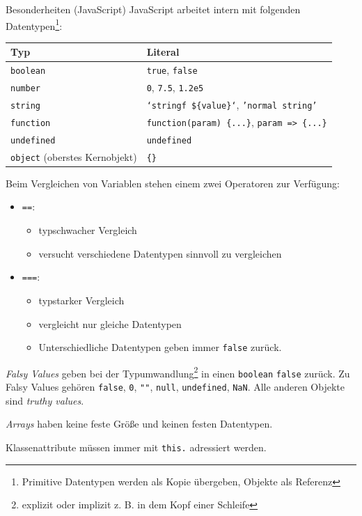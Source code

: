 \begin{bonus}{Besonderheiten (JavaScript)}
    JavaScript arbeitet intern mit folgenden Datentypen\footnote{Primitive Datentypen werden als Kopie übergeben, Objekte als Referenz}:

    \begin{tabular}{|l|l|}
        \hline
        Typ                                   & Literal                                                     \\\hline\hline
        \texttt{boolean}                      & \texttt{true}, \texttt{false}                               \\\hline
        \texttt{number}                       & \texttt{0}, \texttt{7.5}, \texttt{1.2e5}                    \\\hline
        \texttt{string}                       & \texttt{`stringf \$\{value\}`}, \texttt{'normal string'}    \\\hline %
        \texttt{function}                     & \texttt{function(param) \{...\}}, \texttt{param => \{...\}} \\\hline
        \texttt{undefined}                    & \texttt{undefined}                                          \\\hline
        \texttt{object} (oberstes Kernobjekt) & \texttt{\{\}}                                               \\\hline
    \end{tabular}

    Beim Vergleichen von Variablen stehen einem zwei Operatoren zur Verfügung:
    \begin{itemize}
        \item \texttt{==}:
              \begin{itemize}
                  \item typschwacher Vergleich
                  \item versucht verschiedene Datentypen sinnvoll zu vergleichen
              \end{itemize}
        \item \texttt{===}:
              \begin{itemize}
                  \item typstarker Vergleich
                  \item vergleicht nur gleiche Datentypen
                  \item Unterschiedliche Datentypen geben immer \texttt{false} zurück.
              \end{itemize}
    \end{itemize}

    \emph{Falsy Values} geben bei der Typumwandlung\footnote{explizit oder implizit z. B. in dem Kopf einer Schleife} in einen \texttt{boolean} \texttt{false} zurück.
    Zu Falsy Values gehören \texttt{false}, \texttt{0}, \texttt{""}, \texttt{null}, \texttt{undefined}, \texttt{NaN}.
    Alle anderen Objekte sind \emph{truthy values}.

    \emph{Arrays} haben keine feste Größe und keinen festen Datentypen.

    Klassenattribute müssen immer mit \texttt{this.} adressiert werden.
\end{bonus}

